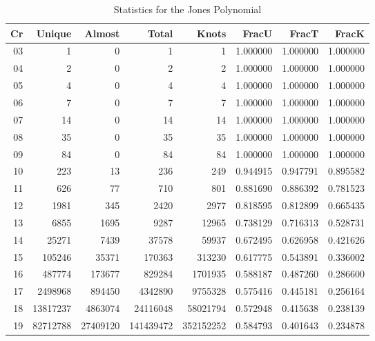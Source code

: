     \begin{table}
        \centering
        \begin{tabular}{| r | r | r | r | r | r | r | r |}
            \hline
            Cr &  Unique  &  Almost  &   Total   &   Knots    &  FracU   &  FracT   &  FracK\\
            \hline
            03 &        1 &        0 &         1 &         1 & 1.000000 & 1.000000 & 1.000000\\
            04 &        2 &        0 &         2 &         2 & 1.000000 & 1.000000 & 1.000000\\
            05 &        4 &        0 &         4 &         4 & 1.000000 & 1.000000 & 1.000000\\
            06 &        7 &        0 &         7 &         7 & 1.000000 & 1.000000 & 1.000000\\
            07 &       14 &        0 &        14 &        14 & 1.000000 & 1.000000 & 1.000000\\
            08 &       35 &        0 &        35 &        35 & 1.000000 & 1.000000 & 1.000000\\
            09 &       84 &        0 &        84 &        84 & 1.000000 & 1.000000 & 1.000000\\
            10 &      223 &       13 &       236 &       249 & 0.944915 & 0.947791 & 0.895582\\
            11 &      626 &       77 &       710 &       801 & 0.881690 & 0.886392 & 0.781523\\
            12 &     1981 &      345 &      2420 &      2977 & 0.818595 & 0.812899 & 0.665435\\
            13 &     6855 &     1695 &      9287 &     12965 & 0.738129 & 0.716313 & 0.528731\\
            14 &    25271 &     7439 &     37578 &     59937 & 0.672495 & 0.626958 & 0.421626\\
            15 &   105246 &    35371 &    170363 &    313230 & 0.617775 & 0.543891 & 0.336002\\
            16 &   487774 &   173677 &    829284 &   1701935 & 0.588187 & 0.487260 & 0.286600\\
            17 &  2498968 &   894450 &   4342890 &   9755328 & 0.575416 & 0.445181 & 0.256164\\
            18 & 13817237 &  4863074 &  24116048 &  58021794 & 0.572948 & 0.415638 & 0.238139\\
            19 & 82712788 & 27409120 & 141439472 & 352152252 & 0.584793 & 0.401643 & 0.234878\\
            \hline
        \end{tabular}
        \caption{Statistics for the Jones Polynomial}
        \label{tab:jones_stat}
    \end{table}
